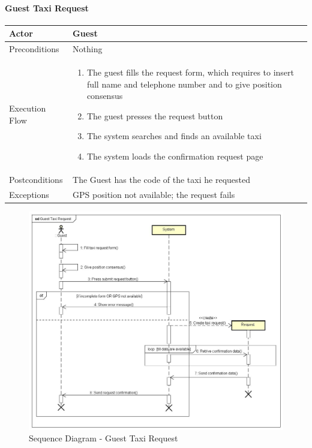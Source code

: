 \paragraph{Guest Taxi Request}
\begin{center}
	\begin{tabular}{ | l | p{8cm} |}
		\hline
		Actor &  Guest	\\ \hline
		Preconditions & Nothing		\\ \hline
		Execution Flow & \begin{enumerate}
			\item The guest fills the request form, which requires to insert full name and telephone number and to give position consensus
			\item The guest presses the request button
			\item The system searches and finds an available taxi
			\item The system loads the confirmation request page
		\end{enumerate}		\\ \hline
		Postconditions & The Guest has the code of the taxi he requested	\\ \hline
		Exceptions & GPS position not available; the request fails \\ \hline
	\end{tabular}
\end{center}
\newpage
\begin{landscape}
\begin{figure}[!h]
	\begin{center}			
		\includegraphics[height=\textheight]{../SE2_SD/GuestTaxiRequest}
		\caption{Sequence Diagram - Guest Taxi Request}	
	\end{center}
\end{figure}
\end{landscape}
\newpage
